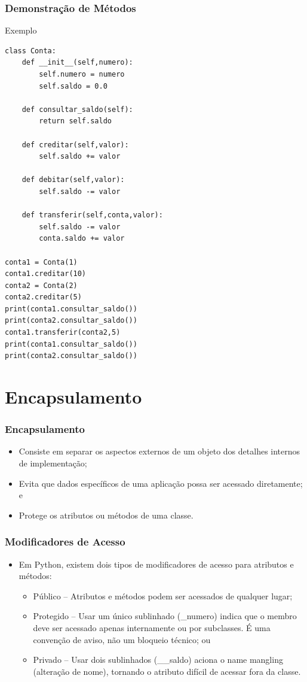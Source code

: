 \documentclass{beamer}
\begin{document}
\begin{frame}[fragile]
	\frametitle{Demonstração de Métodos}
	
	\begin{exampleblock}{Exemplo}
		\begin{lstlisting}
class Conta:
    def __init__(self,numero):
        self.numero = numero
        self.saldo = 0.0

    def consultar_saldo(self):
        return self.saldo

    def creditar(self,valor):
        self.saldo += valor

    def debitar(self,valor):
        self.saldo -= valor

    def transferir(self,conta,valor):
        self.saldo -= valor
        conta.saldo += valor

conta1 = Conta(1)
conta1.creditar(10)
conta2 = Conta(2)
conta2.creditar(5)
print(conta1.consultar_saldo())
print(conta2.consultar_saldo())
conta1.transferir(conta2,5)
print(conta1.consultar_saldo())
print(conta2.consultar_saldo())
		\end{lstlisting}
	\end{exampleblock}
\end{frame}

\section{Encapsulamento}

\begin{frame}
	\frametitle{Encapsulamento}
	
	\begin{itemize}
	  \item Consiste em separar os aspectos externos de um objeto dos detalhes
	  internos de implementação;
	  \item Evita que dados específicos de uma aplicação possa ser acessado
	  diretamente; e
	  \item Protege os atributos ou métodos de uma classe.
	\end{itemize}
\end{frame}

\begin{frame}
	\frametitle{Modificadores de Acesso}
	
	\begin{itemize}
	  \item Em Python, existem dois tipos de modificadores de acesso para atributos
	  e métodos:
	  \begin{itemize}
	    \item Público -- Atributos e métodos podem ser acessados de qualquer lugar; 
	    \item Protegido -- Usar um único sublinhado (\_numero) indica que o membro deve ser acessado apenas internamente ou por subclasses. É uma convenção de aviso, não um bloqueio técnico; ou
	    \item Privado -- Usar dois sublinhados (\_\_saldo) aciona o name mangling (alteração de nome), tornando o atributo difícil de acessar fora da classe.
	  \end{itemize}
	\end{itemize}
\end{frame}
\end{document}
